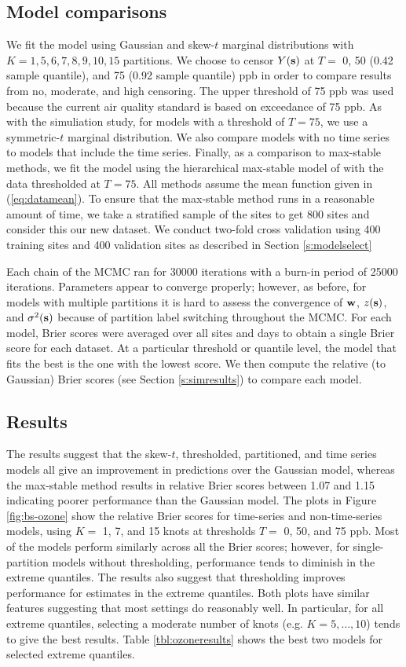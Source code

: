 \documentclass[11pt]{article}
\begin{document}
\subsection{Model comparisons}
We fit the model using Gaussian and skew-$t$ marginal distributions with $K=1, 5, 6, 7, 8, 9, 10, 15$ partitions.
We choose to censor $Y(\mbox{\bf s})$ at $T =$ 0, 50 (0.42 sample quantile), and 75 (0.92 sample quantile) ppb in order to compare results from no, moderate, and high censoring.
The upper threshold of 75 ppb was used because the current air quality standard is based on exceedance of 75 ppb.
As with the simuliation study, for models with a threshold of $T = 75$, we use a symmetric-$t$ marginal distribution.
We also compare models with no time series to models that include the time series.
Finally, as a comparison to max-stable methods, we fit the model using the hierarchical max-stable model of \citet{Reich2012} with the data thresholded at $T = 75$.
All methods assume the mean function given in (\ref{eq:datamean}).
To ensure that the max-stable method runs in a reasonable amount of time, we take a stratified sample of the sites to get 800 sites and consider this our new dataset.
We conduct two-fold cross validation using 400 training sites and 400 validation sites as described in Section \ref{s:modelselect}

Each chain of the MCMC ran for 30000 iterations with a burn-in period of 25000 iterations.
Parameters appear to converge properly; however, as before, for models with multiple partitions it is hard to assess the convergence of $\mbox{\bf w}$, $z(\mbox{\bf s})$, and $\sigma^2(\mbox{\bf s})$ because of partition label switching throughout the MCMC.
For each model, Brier scores were averaged over all sites and days to obtain a single Brier score for each dataset.
At a particular threshold or quantile level, the model that fits the best is the one with the lowest score.
We then compute the relative (to Gaussian) Brier scores (see Section \ref{s:simresults}) to compare each model.

\subsection{Results}\label{s:results}
The results suggest that the skew-$t$, thresholded, partitioned, and time series models all give an improvement in predictions over the Gaussian model, whereas the max-stable method results in relative Brier scores between 1.07 and 1.15 indicating poorer performance than the Gaussian model.
The plots in Figure \ref{fig:bs-ozone} show the relative Brier scores for time-series and non-time-series models, using $K = $ 1, 7, and 15 knots at thresholds $T = $ 0, 50, and 75 ppb.
Most of the models perform similarly across all the Brier scores; however, for single-partition models without thresholding, performance tends to diminish in the extreme quantiles.
The results also suggest that thresholding improves performance for estimates in the extreme quantiles.
Both plots have similar features suggesting that most settings do reasonably well.
In particular, for all extreme quantiles, selecting a moderate number of knots (e.g. $K = 5, \ldots, 10$) tends to give the best results.
Table \ref{tbl:ozoneresults} shows the best two models for selected extreme quantiles.
\end{document}
